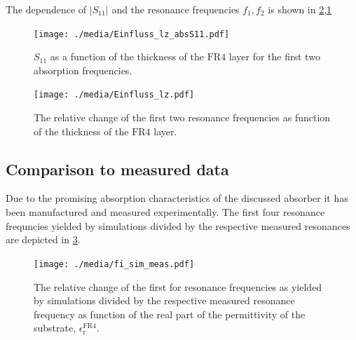 The dependence of $|S_{11}|$ and the resonance frequencies $f_1, f_2$ is shown in \cref{fig:lz_fi},\cref{fig:lz_absS11}

\begin{figure}
\centering
\texttt{[image: ./media/Einfluss\_lz\_absS11.pdf]}
\caption{$S_{11}$ as a function of the thickness of the $\mathrm{FR4}$ layer for the first two absorption frequencies.}
\label{fig:lz_absS11}
\end{figure}
\begin{figure}
\centering
\texttt{[image: ./media/Einfluss\_lz.pdf]}
\caption{The relative change of the first two resonance frequencies as function of the thickness of the $\mathrm{FR4}$ layer.}
\label{fig:lz_fi}
\end{figure}

\subsection{Comparison to measured data}
Due to the promising absorption characteristics of the discussed absorber it has been manufactured and measured experimentally. The first four resonance frequncies yielded by simulations divided by the respective measured resonances are depicted in \cref{fig:sim_meas_vgl}.
\begin{figure}
\centering
\texttt{[image: ./media/fi\_sim\_meas.pdf]}
\caption{The relative change of the first for resonance frequencies as yielded by simulations divided by the respective measured resonance frequency as function of the real part of the permittivity of the substrate, $\epsilon_\mathrm{r}^\mathrm{FR4}$.}
\label{fig:sim_meas_vgl}
\end{figure}
